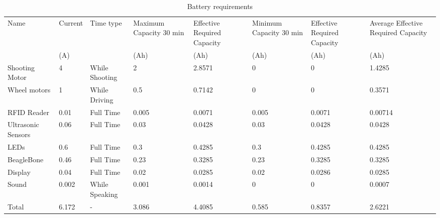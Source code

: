 \documentclass[11pt,twoside,a4paper]{report}
\begin{document}
\begin{appendices}
\begin{table}
\caption{Battery requirements}
\begin{center}
\begin{tabular}{m{2cm}|m{2cm}|m{2cm}|m{2cm}|m{2cm}|m{2cm}|m{2cm}|m{3.2cm}|}
Name               & Current & Time type      & Maximum Capacity 30 min & Effective Required Capacity & Minimum Capacity 30 min & Effective Required Capacity & Average Effective Required Capacity \\
                   & (A)     &                & (Ah)                    & (Ah)                        & (Ah)                    & (Ah)                        & (Ah)                                \\
Shooting Motor     & 4       & While Shooting & 2                       & 2.8571                & 0                       & 0                           & 1.4285                        \\
Wheel motors       & 1       & While Driving  & 0.5                     & 0.7142               & 0                       & 0                           & 0.3571                        \\
RFID Reader        & 0.01    & Full Time      & 0.005                   & 0.0071                & 0.005                   & 0.0071                & 0.00714 \\
Ultrasonic Sensors & 0.06    & Full Time      & 0.03                    & 0.0428              & 0.03                    & 0.0428                & 0.0428                        \\
LEDs               & 0.6     & Full Time      & 0.3                     & 0.4285                & 0.3                     & 0.4285                & 0.4285                       \\
BeagleBone         & 0.46    & Full Time      & 0.23                    & 0.3285               & 0.23                    & 0.3285               & 0.3285                        \\
Display            & 0.04    & Full Time      & 0.02                    & 0.0285                & 0.02                    & 0.0286               & 0.0285                        \\
Sound              & 0.002   & While Speaking & 0.001                   & 0.0014              & 0                       & 0                           & 0.0007                        \\
Total              & 6.172   &     -           & 3.086                   & 4.4085               & 0.585                   & 0.8357               & 2.6221                       
\end{tabular}
\end{center}
\label{table:battery}
\end{table}
\label{appendix:battery}


\end{appendices}
\end{document}
